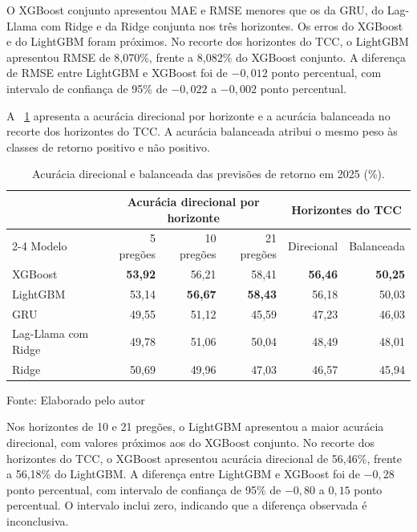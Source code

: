 O XGBoost conjunto apresentou MAE e RMSE menores que os da GRU, do Lag-Llama com Ridge e da Ridge conjunta nos três horizontes. Os erros do XGBoost e do LightGBM foram próximos. No recorte dos horizontes do TCC, o LightGBM apresentou RMSE de 8,070\%, frente a 8,082\% do XGBoost conjunto. A diferença de RMSE entre LightGBM e XGBoost foi de $-0{,}012$ ponto percentual, com intervalo de confiança de 95\% de $-0{,}022$ a $-0{,}002$ ponto percentual.

A ~\ref{tab:comparacao_modelos_direcao} apresenta a acurácia direcional por horizonte e a acurácia balanceada no recorte dos horizontes do TCC. A acurácia balanceada atribui o mesmo peso às classes de retorno positivo e não positivo.

\begin{table}[htbp]
    \centering
    \caption{Acurácia direcional e balanceada das previsões de retorno em 2025 (\%).}
    \label{tab:comparacao_modelos_direcao}
    {\small
    \setlength{\tabcolsep}{4pt}
    \begin{tabular}{@{}lrrrrr@{}}
        \hline
        & \multicolumn{3}{c}{Acurácia direcional por horizonte}
        & \multicolumn{2}{c}{Horizontes do TCC} \\
        \cline{2-4}\cline{5-6}
        Modelo & 5 pregões & 10 pregões & 21 pregões & Direcional & Balanceada \\
        \hline
        XGBoost             & \textbf{53,92} & 56,21 & 58,41 & \textbf{56,46} & \textbf{50,25} \\
        LightGBM            & 53,14 & \textbf{56,67} & \textbf{58,43} & 56,18 & 50,03 \\
        GRU                 & 49,55 & 51,12 & 45,59 & 47,23 & 46,03 \\
        Lag-Llama com Ridge & 49,78 & 51,06 & 50,04 & 48,49 & 48,01 \\
        Ridge               & 50,69 & 49,96 & 47,03 & 46,57 & 45,94 \\
        \hline
    \end{tabular}
    }
    \par\smallskip
    Fonte: Elaborado pelo autor
\end{table}

Nos horizontes de 10 e 21 pregões, o LightGBM apresentou a maior acurácia direcional, com valores próximos aos do XGBoost conjunto. No recorte dos horizontes do TCC, o XGBoost apresentou acurácia direcional de 56,46\%, frente a 56,18\% do LightGBM. A diferença entre LightGBM e XGBoost foi de $-0{,}28$ ponto percentual, com intervalo de confiança de 95\% de $-0{,}80$ a $0{,}15$ ponto percentual. O intervalo inclui zero, indicando que a diferença observada é inconclusiva.

